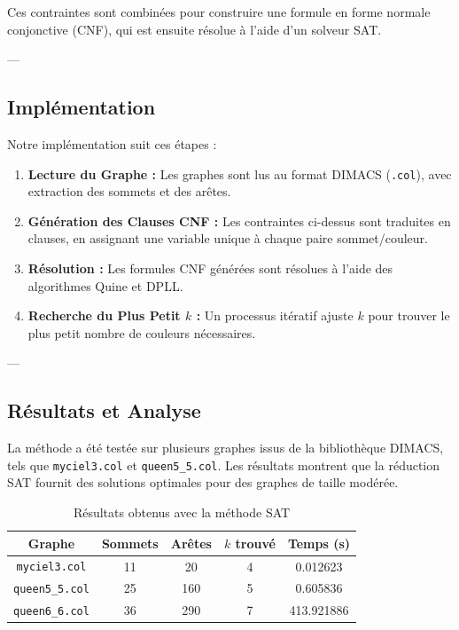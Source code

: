 \documentclass[11pt]{article}
\begin{document}
Ces contraintes sont combinées pour construire une formule en forme normale conjonctive (CNF), qui est ensuite résolue à l'aide d'un solveur SAT.

---

\subsection{Implémentation}

Notre implémentation suit ces étapes :
\begin{enumerate}
    \item \textbf{Lecture du Graphe :} Les graphes sont lus au format DIMACS (\texttt{.col}), avec extraction des sommets et des arêtes.
    \item \textbf{Génération des Clauses CNF :} Les contraintes ci-dessus sont traduites en clauses, en assignant une variable unique à chaque paire sommet/couleur.
    \item \textbf{Résolution :} Les formules CNF générées sont résolues à l'aide des algorithmes Quine et DPLL.
    \item \textbf{Recherche du Plus Petit \(k\) :} Un processus itératif ajuste \(k\) pour trouver le plus petit nombre de couleurs nécessaires.
\end{enumerate}

---

\subsection{Résultats et Analyse}

La méthode a été testée sur plusieurs graphes issus de la bibliothèque DIMACS, tels que \texttt{myciel3.col} et \texttt{queen5\_5.col}. Les résultats montrent que la réduction SAT fournit des solutions optimales pour des graphes de taille modérée.

\begin{table}[h!]
\centering
\begin{tabular}{|c|c|c|c|c|}
\hline
\textbf{Graphe} & \textbf{Sommets} & \textbf{Arêtes} & \textbf{\(k\) trouvé} & \textbf{Temps (s)} \\ \hline
\texttt{myciel3.col} & 11 & 20 & 4 & 0.012623 \\
\texttt{queen5\_5.col} & 25 & 160 & 5 & 0.605836 \\
\texttt{queen6\_6.col} & 36 & 290 & 7 & 413.921886 \\
\hline
\end{tabular}
\caption{Résultats obtenus avec la méthode SAT}
\label{tab:sat_results}
\end{table}
\end{document}
